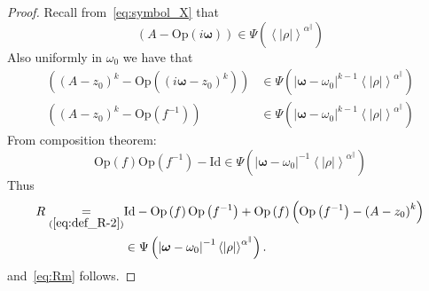\documentclass[10pt]{amsart}
\theoremstyle{definition}\newtheorem{defi}[theo]{Definition}\newtheorem{rema}[theo]{Remark}\newtheorem{exam}[theo]{Example}\newtheorem{exem}[theo]{Example}\newtheorem{nota}[theo]{Notation}
\newcommand*\eq[1]{\underset{(#1)}{=}}
\newcommand{\Opp}{\mathrm{Op}}
\newcommand{\Id}{\mathrm{Id}}
\begin{document}
\begin{proof}
Recall from~\eqref{eq:symbol_X} that
\[
\left(A-\Opp \left(i\boldsymbol{\omega}\right)\right)\in\Psi\left(\left\langle \left|\rho\right|\right\rangle ^{\alpha^{\parallel}}\right)
\]
Also uniformly in $\omega_{0}$ we have that
\begin{align*}
\left(\left(A-z_{0}\right)^{k}-\Opp \left(\left(i\boldsymbol{\omega}-z_{0}\right)^{k}\right)\right) &\in\Psi\left(\left|\boldsymbol{\omega}-\omega_{0}\right|^{k-1}\left\langle \left|\rho\right|\right\rangle ^{\alpha^{\parallel}}\right)
\\
\left(\left(A-z_{0}\right)^{k}-\Opp \left(f^{-1}\right)\right)&\in\Psi\left(\left|\boldsymbol{\omega}-\omega_{0}\right|^{k-1}\left\langle \left|\rho\right|\right\rangle ^{\alpha^{\parallel}}\right)
\end{align*}
From composition theorem:
\[
\Opp \left(f\right)\Opp \left(f^{-1}\right)-\Id \in\Psi\left(\left|\boldsymbol{\omega}-\omega_{0}\right|^{-1}\left\langle \left|\rho\right|\right\rangle ^{\alpha^{\parallel}}\right)
\]
Thus
\begin{align*}
R  \eq{\ref{eq:def_R-2}}&\Id -\Opp \left(f\right)\Opp \left(f^{-1}\right)+\Opp \left(f\right)\left(\Opp \left(f^{-1}\right)-\left(A-z_{0}\right)^{k}\right)\\
& \in\Psi\left(\left|\boldsymbol{\omega}-\omega_{0}\right|^{-1}\left\langle \left|\rho\right|\right\rangle ^{\alpha^{\parallel}}\right).
\end{align*}
and~\eqref{eq:Rm} follows.
\end{proof}
\end{document}
